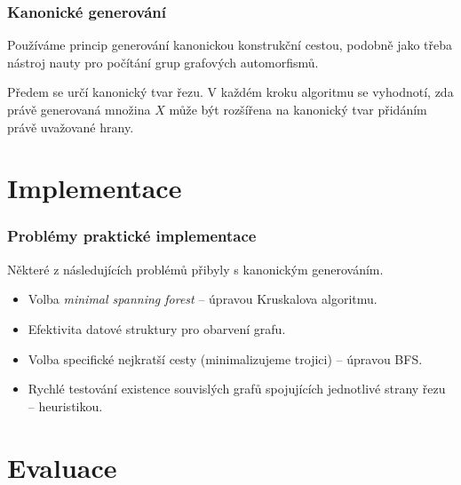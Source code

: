 \documentclass[10pt]{beamer}
\begin{document}
\begin{frame}
	\frametitle{Kanonické generování}

	Používáme princip generování kanonickou konstrukční cestou, podobně jako třeba nástroj nauty pro počítání grup grafových automorfismů.

	Předem se určí kanonický tvar řezu. V každém kroku algoritmu se vyhodnotí, zda právě generovaná množina $X$ může být rozšířena na kanonický tvar přidáním právě uvažované hrany.

\end{frame}

\section{Implementace}

\begin{frame}
	\frametitle{Problémy praktické implementace}

	Některé z následujících problémů přibyly s kanonickým generováním.

	\begin{itemize}
		\item Volba \textit{minimal spanning forest} -- úpravou Kruskalova algoritmu.
		\item Efektivita datové struktury pro obarvení grafu.
		\item Volba specifické nejkratší cesty (minimalizujeme trojici) -- úpravou BFS.
		\item Rychlé testování existence souvislých grafů spojujících jednotlivé strany řezu -- heuristikou.
	\end{itemize}

\end{frame}

\section{Evaluace}
\end{document}
